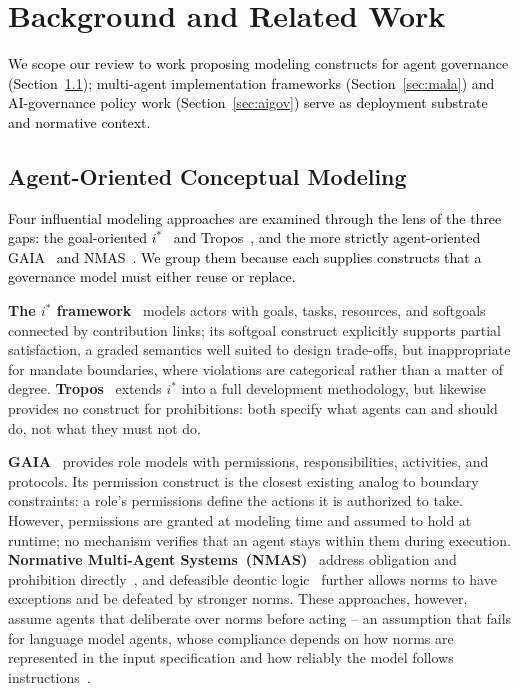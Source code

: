 \documentclass[runningheads]{llncs}
\begin{document}
\section{Background and Related Work}
\label{sec:background}

\textcolor{black}{We scope our review to work proposing modeling constructs for agent governance (Section~\ref{sec:aomodeling}); multi-agent implementation frameworks (Section~\ref{sec:mala}) and AI-governance policy work (Section~\ref{sec:aigov}) serve as deployment substrate and normative context.}

\subsection{Agent-Oriented Conceptual Modeling}
\label{sec:aomodeling}

\textcolor{black}{Four influential modeling approaches are examined through the lens of the three gaps: the goal-oriented $i^*$~\cite{yu2011social} and Tropos~\cite{bresciani2004tropos}, and the more strictly agent-oriented GAIA~\cite{wooldridge2000gaia} and NMAS~\cite{boella2006introduction}. We group them because each supplies constructs that a governance model must either reuse or replace.}

\textbf{The $i^*$ framework}~\cite{yu2011social} models actors with goals, tasks, resources, and softgoals connected by contribution links; its softgoal construct explicitly supports partial satisfaction, a graded semantics well suited to design trade-offs, but inappropriate for mandate boundaries, where violations are categorical rather than a matter of degree.
\textbf{Tropos}~\cite{bresciani2004tropos} extends $i^*$ into a full
development methodology, but likewise provides no construct for prohibitions: both specify what agents can and should do, not what they
must not do.

\textbf{GAIA}~\cite{wooldridge2000gaia} provides role models with permissions, responsibilities, activities, and protocols. Its permission construct is the closest existing analog to boundary constraints: a
role's permissions define the actions it is authorized to take. However, permissions are granted at modeling time and assumed to hold at runtime; no mechanism verifies that an agent stays within them during execution. 
\textbf{Normative Multi-Agent Systems~(NMAS)}~\cite{governatori2007characterising,boella2006introduction,dignum1999autonomous} address obligation and prohibition directly~\cite{vonwright1951essay}, and defeasible deontic logic~\cite{governatori2007characterising} further allows norms to have exceptions and
be defeated by stronger norms. These approaches, however, assume agents that
deliberate over norms before acting -- an assumption that fails for language model agents, whose compliance depends on how norms are represented in the input specification and how reliably the model follows instructions~\cite{huang2023selfcorrect}.
\end{document}
